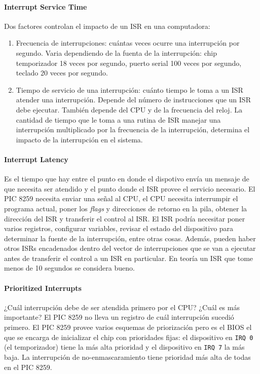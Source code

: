 \paragraph{Interrupt Service Time}
Dos factores controlan el impacto de un ISR en una computadora:
\begin{enumerate}
    \item Frecuencia de interrupciones: cuántas veces ocurre una interrupción por segundo. Varia dependiendo de la fuenta de la interrupción: chip temporizador 18 veces por segundo, puerto serial 100 veces por segundo, teclado 20 veces por segundo.
    \item Tiempo de servicio de una interrupción: cuánto tiempo le toma a un ISR atender una interrupción. Depende del número de instrucciones que un ISR debe ejecutar. También depende del CPU y de la frecuencia del reloj. La cantidad de tiempo que le toma a una rutina de ISR manejar una interrupción multiplicado por la frecuencia de la interrupción, determina el impacto de la interrupción en el sistema.
\end{enumerate}

\paragraph{Interrupt Latency}
Es el tiempo que hay entre el punto en donde el dispotivo envía un mensaje de que necesita ser atendido y el punto donde el ISR provee el servicio necesario. El PIC 8259 necesita enviar una señal al CPU, el CPU necesita interrumpir el programa actual, poner los \textit{flags} y direcciones de retorno en la pila, obtener la dirección del ISR y transferir el control al ISR. El ISR podría necesitar poner varios registros, configurar variables, revisar el estado del dispositivo para determinar la fuente de la interrupción, entre otras cosas. Además, pueden haber otros ISRs encadenados dentro del vector de interrupciones que se van a ejecutar antes de transferir el control a un ISR en particular. En teoría un ISR que tome menos de 10 segundos se considera bueno.

\paragraph{Prioritized Interrupts}
¿Cuál interrupción debe de ser atendida primero por el CPU? ¿Cuál es más importante? El PIC 8259 no lleva un registro de cuál interrupción sucedió primero. El PIC 8259 provee varios esquemas de priorización pero es el BIOS el que se encarga de inicializar el chip con prioridades fijas: el dispositivo en \texttt{IRQ 0} (el temporizador) tiene la más alta prioridad y el dispositivo en \texttt{IRQ 7} la más baja. La interrupción de no-enmascaramiento tiene prioridad más alta de todas en el PIC 8259.

